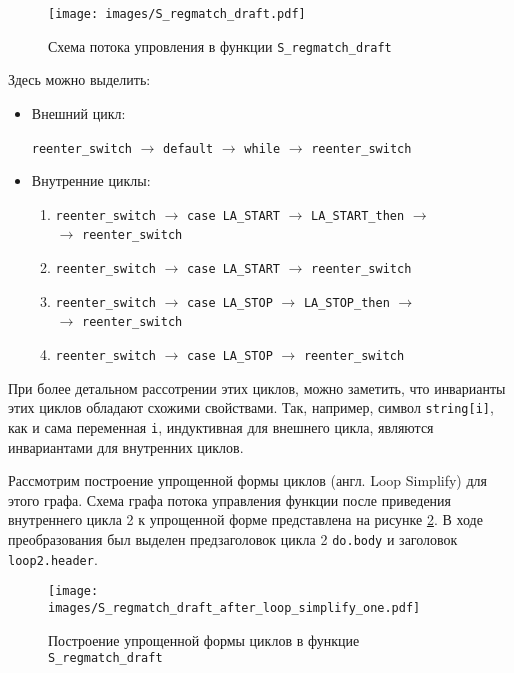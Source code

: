 \begin{figure}
    \centering
    \texttt{[image: images/S\_regmatch\_draft.pdf]}
    \caption{Схема потока упровления в функции \texttt{S\_regmatch\_draft}}
    \label{fig:S_regmatch_darft}
\end{figure}

Здесь можно выделить:
\begin{itemize}
    \item Внешний цикл:

        \texttt{reenter\_switch} $\rightarrow$ \texttt{default} $\rightarrow$ \texttt{while} $\rightarrow$ \texttt{reenter\_switch}

    \item Внутренние циклы:

        \begin{enumerate}
            \item \texttt{reenter\_switch} $\rightarrow$ \texttt{case LA\_START} $\rightarrow$ \texttt{LA\_START\_then} $\rightarrow$\\ $\rightarrow$ \texttt{reenter\_switch}
            \item \texttt{reenter\_switch} $\rightarrow$ \texttt{case LA\_START} $\rightarrow$ \texttt{reenter\_switch}
            \item \texttt{reenter\_switch} $\rightarrow$ \texttt{case LA\_STOP} $\rightarrow$ \texttt{LA\_STOP\_then} $\rightarrow$\\$\rightarrow$ \texttt{reenter\_switch}
            \item \texttt{reenter\_switch} $\rightarrow$ \texttt{case LA\_STOP} $\rightarrow$ \texttt{reenter\_switch}
        \end{enumerate}
\end{itemize}

При более детальном рассотрении этих циклов, можно заметить, что инварианты этих циклов обладают схожими свойствами.
Так, например, символ \texttt{string[i]}, как и сама переменная \texttt{i}, индуктивная для внешнего цикла, являются инвариантами для внутренних циклов.

Рассмотрим построение упрощенной формы циклов (англ. Loop Simplify) для этого графа.
Схема графа потока управления функции после приведения внутреннего цикла 2 к упрощенной форме представлена на рисунке \ref{fig:S_regmatch_darft_loop_simplify_one}.
В ходе преобразования был выделен предзаголовок цикла 2 \texttt{do.body} и заголовок \texttt{loop2.header}.

\begin{figure}
    \centering
    \texttt{[image: images/S\_regmatch\_draft\_after\_loop\_simplify\_one.pdf]}
    \caption{Построение упрощенной формы циклов в функцие \texttt{S\_regmatch\_draft}}
    \label{fig:S_regmatch_darft_loop_simplify_one}
\end{figure}

